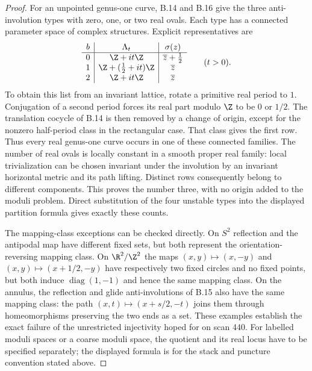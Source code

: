 \begin{proof}
For an unpointed genus-one curve, B.14 and B.16 give the three
anti-involution types with zero, one, or two real ovals. Each type
has a connected parameter space of complex structures. Explicit
representatives are
\[
 \begin{array}{c|c|c}
 b&\Lambda_t&\sigma(z)\\\hline
 0&\Z+it\Z&\overline z+\tfrac12\\
 1&\Z+(\tfrac12+it)\Z&\overline z\\
 2&\Z+it\Z&\overline z
 \end{array}\qquad(t>0).
\]
To obtain this list from an invariant lattice, rotate a primitive
real period to $1$. Conjugation of a second period forces its real
part modulo $\Z$ to be $0$ or $1/2$. The translation cocycle of
B.14 is then removed by a change of origin, except for the
nonzero half-period class in the rectangular case. That class gives
the first row. Thus every real genus-one curve occurs in one of
these connected families. The number of real ovals is locally
constant in a smooth proper real family: local trivialization can
be chosen invariant under the involution by an invariant horizontal
metric and its path lifting. Distinct rows consequently belong to
different components. This proves the number three, with no origin
added to the moduli problem. Direct substitution of the four
unstable types into the displayed partition formula gives exactly
these counts.

The mapping-class exceptions can be checked directly. On $S^2$ reflection and the antipodal
map have different fixed sets, but both represent the orientation-reversing
mapping class. On $\R^2/\Z^2$ the maps $(x,y)\mapsto(x,-y)$ and
$(x,y)\mapsto(x+1/2,-y)$ have respectively two fixed circles and no fixed
points, but both induce $\operatorname{diag}(1,-1)$ and hence the same mapping
class. On the annulus, the reflection and glide anti-involutions of B.15 also have
the same mapping class: the path $(x,t)\mapsto(x+s/2,-t)$ joins them through
homeomorphisms preserving the two ends as a set. These examples establish the exact failure of the unrestricted
injectivity hoped for on scan 440. For labelled moduli spaces or a coarse
moduli space, the quotient and its real locus have to be specified separately;
the displayed formula is for the stack and puncture convention stated above.
\end{proof}

